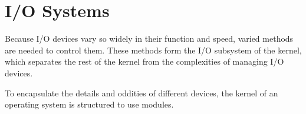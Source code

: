 \section{I/O Systems}\label{sec:IO_Systems}
Because I/O devices vary so widely in their function and speed, varied methods are needed to control them.
These methods form the I/O subsystem of the kernel, which separates the rest of the kernel from the complexities of managing I/O devices.

To encapsulate the details and oddities of different devices, the kernel of an operating system is structured to use  modules.


